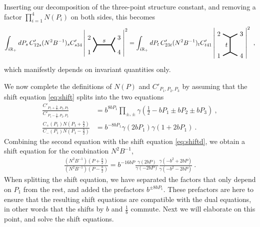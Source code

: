 \documentclass[12pt, a4paper, notitlepage, twoside]{report}
\numberwithin{equation}{section}
\theoremstyle{break}
\begin{document}
Inserting our decomposition of the three-point structure constant, and 
removing a factor $\prod_{i=1}^4 N(P_i)$ on both sides, this becomes
\begin{align}
 \int_{i\mathbb{R}_+} dP_s\, C'_{12s}(N^2B^{-1})_s C'_{s34} \left| 
 \begin{tikzpicture}[baseline=(current  bounding  box.center), very thick, scale = .2]
\draw (-1,2) node [left] {$2$} -- (0,0) -- node [above] {$s$} (4,0) -- (5,2) node [right] {$3$};
\draw (-1,-2) node [left] {$1$} -- (0,0);
\draw (4,0) -- (5,-2) node [right] {$4$};
\end{tikzpicture} 
\right|^2 = \int_{i\mathbb{R}_+} dP_t\, C'_{23t}(N^2B^{-1})_tC'_{t41} \left|
\begin{tikzpicture}[baseline=(current  bounding  box.center), very thick, scale = .2]
 \draw (-2,3) node [left] {$2$} -- (0,2) -- node [left] {$t$} (0,-2) -- (-2, -3) node [left] {$1$};
\draw (0,2) -- (2,3) node [right] {$3$};
\draw (0,-2) -- (2, -3) node [right] {$4$};
\end{tikzpicture}
\right|^2\ ,
\end{align}
which manifestly depends on invariant quantities only.

We now complete the definitions of $N(P)$ and $C'_{P_1,P_2,P_3}$
by assuming that the shift equation \eqref{eq:shift} splits into the two equations 
\begin{align}
\frac{C'_{P_1+\frac{b}{2},P_2,P_3}}{C'_{P_1-\frac{b}{2},P_2,P_3} } 
 &=b^{8bP_1}\prod_{\pm,\pm} \gamma(\tfrac12 -bP_1 \pm bP_2 \pm bP_3)\ ,
 \label{cps}
 \\
\frac{C_+(P_1) N(P_1+\frac{b}{2})}{C_-(P_1) N(P_1-\frac{b}{2}) } 
 &=b^{-8bP_1}\gamma(2bP_1) \gamma(1+2bP_1) \ .
 \label{cns}
\end{align}
Combining the second equation with the shift equation \eqref{eq:shiftd}, we obtain a shift equation for the combination $N^2B^{-1}$,
\begin{align}
 \frac{\left(N^2B^{-1}\right)(P+\frac{b}{2})}{\left(N^2B^{-1}\right)(P-\frac{b}{2})} = b^{-16bP} \frac{\gamma(2bP)}{\gamma(-2bP)} \frac{\gamma(-b^2+2bP)}{\gamma(-b^2-2bP)}\ .
 \label{nbs}
\end{align}
When splitting the shift equation, we have separated the factors that only depend on $P_1$ from the rest, and added the prefactors $b^{\pm 8bP_1}$. These prefactors are here to ensure that the resulting shift equations are compatible with the dual equations, in other words that the shifts by $b$ and $\frac{1}{b}$ commute. Next we will elaborate on this point, and solve the shift equations.
\end{document}
